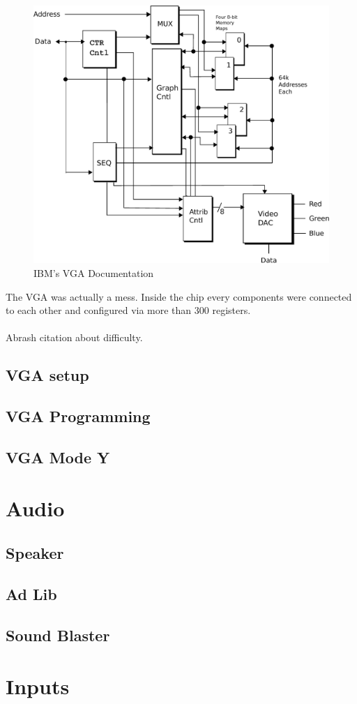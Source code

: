 \documentclass[book.tex]{subfiles}
\begin{document}
\begin{figure}[H]
\centering
\includegraphics[scale=0.38]{imgs/ibm_vga.eps}
%
\caption{IBM's VGA Documentation}
\label{fig:ibm_vga}
\end{figure}

The VGA was actually a mess. Inside the chip every components were connected to each other and configured via more than 300 registers.\\
\\
Abrash citation about difficulty.
 
 
  \subsection{VGA setup}

  \subsection{VGA Programming}
  \subsection{VGA Mode Y}
\section{Audio}
  \subsection{Speaker}
  \subsection{Ad Lib}
  \subsection{Sound Blaster}

\section{Inputs}
\end{document}
